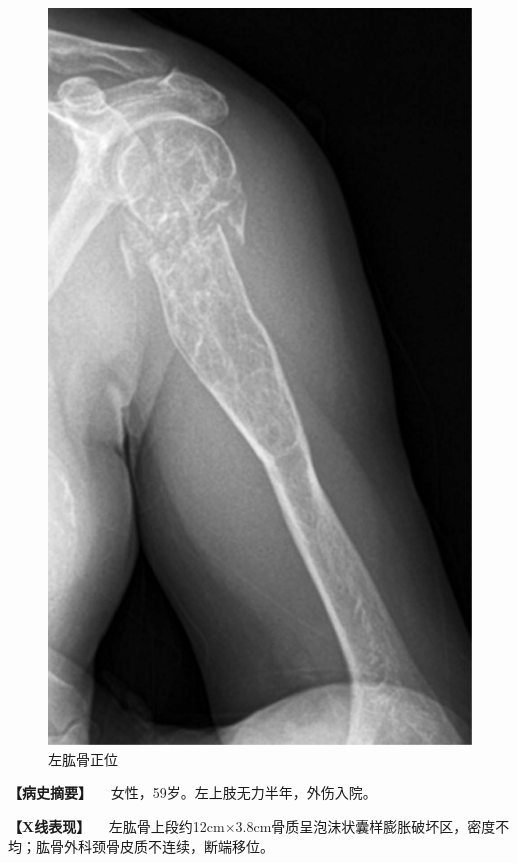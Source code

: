 \begin{figure}[!htbp]
 \centering
 \includegraphics{./images/Image00097.jpg}
 \captionsetup{justification=centering}
 \caption{左肱骨正位}
 \label{fig2-7-12}
  \end{figure} 

\textbf{【病史摘要】} 　女性，59岁。左上肢无力半年，外伤入院。

\textbf{【X线表现】}
　左肱骨上段约12cm×3.8cm骨质呈泡沫状囊样膨胀破坏区，密度不均；肱骨外科颈骨皮质不连续，断端移位。

